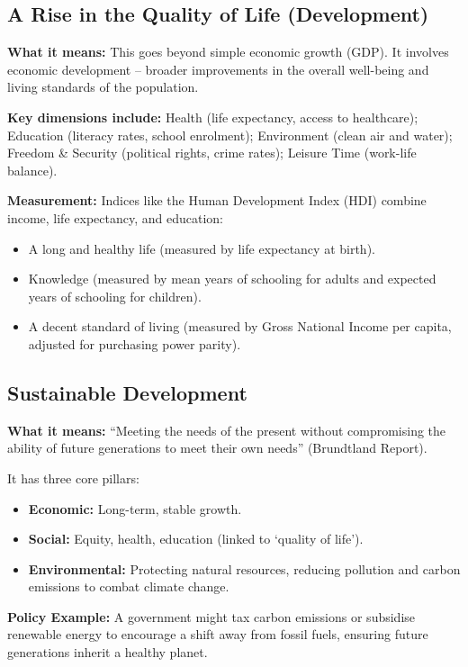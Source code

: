 \documentclass[11pt, a4paper, twoside]{book}
\begin{document}
\subsection{A Rise in the Quality of Life (Development)}

\textbf{What it means:} This goes beyond simple economic growth (GDP). It involves economic development -- broader improvements in the overall well-being and living standards of the population.

\textbf{Key dimensions include:} Health (life expectancy, access to healthcare); Education (literacy rates, school enrolment); Environment (clean air and water); Freedom \& Security (political rights, crime rates); Leisure Time (work-life balance).

\textbf{Measurement:} Indices like the Human Development Index (HDI) combine income, life expectancy, and education:
\begin{itemize}
  \item A long and healthy life (measured by life expectancy at birth).
  \item Knowledge (measured by mean years of schooling for adults and expected years of schooling for children).
  \item A decent standard of living (measured by Gross National Income per capita, adjusted for purchasing power parity).
\end{itemize}

\subsection{Sustainable Development}

\textbf{What it means:} ``Meeting the needs of the present without compromising the ability of future generations to meet their own needs'' (Brundtland Report).

It has three core pillars:
\begin{itemize}
  \item \textbf{Economic:} Long-term, stable growth.
  \item \textbf{Social:} Equity, health, education (linked to `quality of life').
  \item \textbf{Environmental:} Protecting natural resources, reducing pollution and carbon emissions to combat climate change.
\end{itemize}

\textbf{Policy Example:} A government might tax carbon emissions or subsidise renewable energy to encourage a shift away from fossil fuels, ensuring future generations inherit a healthy planet.
\end{document}
